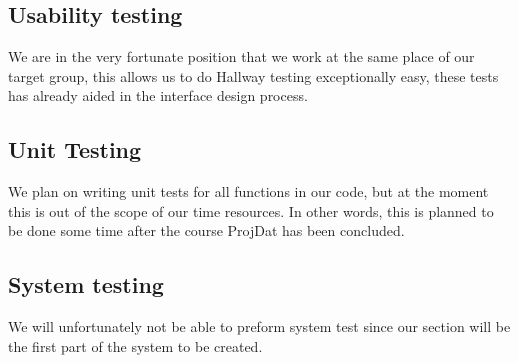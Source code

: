 \documentclass[11pt,a4paper]{report}
\begin{document}
\subsection{Usability testing}
We are in the very fortunate position that we work at the same place of our target group, this allows us to do Hallway testing exceptionally easy, these tests has already aided in the interface design process. %

\subsection{Unit Testing}
We plan on writing unit tests for all functions in our code, but at the moment this is out of the scope of our time resources. In other words, this is planned to be done some time after the course ProjDat has been concluded.

\subsection{System testing}
We will unfortunately not be able to preform system test since our section will be the first part of the system to be created.

\subsection{}

\newpage
\end{document}
